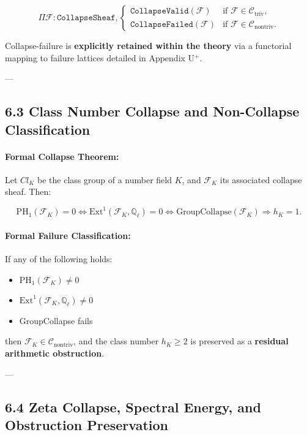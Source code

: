 \documentclass[11pt]{article}
\begin{document}
\[
\Pi \mathcal{F} : \texttt{CollapseSheaf},
\begin{cases}
\texttt{CollapseValid}(\mathcal{F}) & \text{if } \mathcal{F} \in \mathcal{C}_{\mathrm{triv}}, \\
\texttt{CollapseFailed}(\mathcal{F}) & \text{if } \mathcal{F} \in \mathcal{C}_{\mathrm{nontriv}}.
\end{cases}
\]

Collapse-failure is \textbf{explicitly retained within the theory} via a functorial mapping to failure lattices detailed in Appendix U$^{+}$.

---

\subsection*{6.3 Class Number Collapse and Non-Collapse Classification}

\paragraph{Formal Collapse Theorem:}
Let \( Cl_K \) be the class group of a number field \( K \), and \( \mathcal{F}_K \) its associated collapse sheaf. Then:

\[
\mathrm{PH}_1(\mathcal{F}_K) = 0 \iff \mathrm{Ext}^1(\mathcal{F}_K, \mathbb{Q}_\ell) = 0 \iff \mathrm{GroupCollapse}(\mathcal{F}_K) \Rightarrow h_K = 1.
\]

\paragraph{Formal Failure Classification:}
If any of the following holds:

\begin{itemize}
    \item \( \mathrm{PH}_1(\mathcal{F}_K) \neq 0 \)
    \item \( \mathrm{Ext}^1(\mathcal{F}_K, \mathbb{Q}_\ell) \neq 0 \)
    \item GroupCollapse fails
\end{itemize}

then \( \mathcal{F}_K \in \mathcal{C}_{\mathrm{nontriv}} \), and the class number \( h_K \geq 2 \) is preserved as a \textbf{residual arithmetic obstruction}.

---

\subsection*{6.4 Zeta Collapse, Spectral Energy, and Obstruction Preservation}
\end{document}
